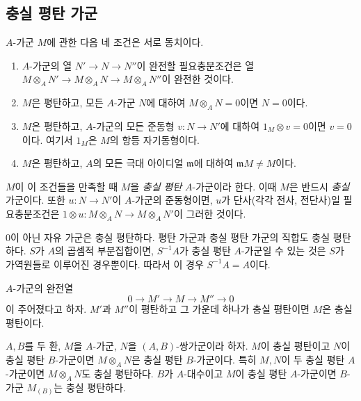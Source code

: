 \subsection{충실 평탄 가군}
\label{subsection:0.6.4-ko}

\begin{env}[6.4.1]
\label{0.6.4.1-ko}
$A$-가군 $M$에 관한 다음 네 조건은 서로 동치이다.
\begin{enumerate}
  \item[$a)$] $A$-가군의 열 $N'\to N\to N''$이 완전할 필요충분조건은
    열
    $M\otimes_A N'\to M\otimes_A N\to M\otimes_A N''$이 완전한 것이다.
  \item[$b)$] $M$은 평탄하고, 모든 $A$-가군 $N$에 대하여
    $M\otimes_A N=0$이면 $N=0$이다.
  \item[$c)$] $M$은 평탄하고, $A$-가군의 모든 준동형 $v:N\to N'$에
    대하여 $1_M\otimes v=0$이면 $v=0$이다. 여기서 $1_M$은 $M$의
    항등 자기동형이다.
  \item[$d)$] $M$은 평탄하고, $A$의 모든 극대 아이디얼
    $\mathfrak m$에 대하여 $\mathfrak mM\neq M$이다.
\end{enumerate}

$M$이 이 조건들을 만족할 때 $M$을 \emph{충실 평탄} $A$-가군이라
한다. 이때 $M$은 반드시 \emph{충실} 가군이다. 또한
$u:N\to N'$이 $A$-가군의 준동형이면, $u$가 단사(각각 전사,
전단사)일 필요충분조건은
$1\otimes u:M\otimes_A N\to M\otimes_A N'$이 그러한 것이다.
\end{env}


\begin{env}[6.4.2]
\label{0.6.4.2-ko}
$0$이 아닌 자유 가군은 충실 평탄하다. 평탄 가군과 충실 평탄
가군의 직합도 충실 평탄하다. $S$가 $A$의 곱셈적 부분집합이면,
$S^{-1}A$가 충실 평탄 $A$-가군일 수 있는 것은 $S$가 가역원들로
이루어진 경우뿐이다. 따라서 이 경우 $S^{-1}A=A$이다.
\end{env}

\begin{env}[6.4.3]
\label{0.6.4.3-ko}
$A$-가군의 완전열
\[
  0\longrightarrow M'\longrightarrow M\longrightarrow M''\longrightarrow 0
\]
이 주어졌다고 하자. $M'$과 $M''$이 평탄하고 그 가운데 하나가
충실 평탄이면 $M$은 충실 평탄이다.
\end{env}

\begin{env}[6.4.4]
\label{0.6.4.4-ko}
$A,B$를 두 환, $M$을 $A$-가군, $N$을 $(A,B)$-쌍가군이라 하자.
$M$이 충실 평탄이고 $N$이 충실 평탄 $B$-가군이면
$M\otimes_A N$은 충실 평탄 $B$-가군이다. 특히 $M,N$이 두 충실
평탄 $A$-가군이면 $M\otimes_A N$도 충실 평탄하다. $B$가
$A$-대수이고 $M$이 충실 평탄 $A$-가군이면 $B$-가군
$M_{(B)}$는 충실 평탄하다.
\end{env}

